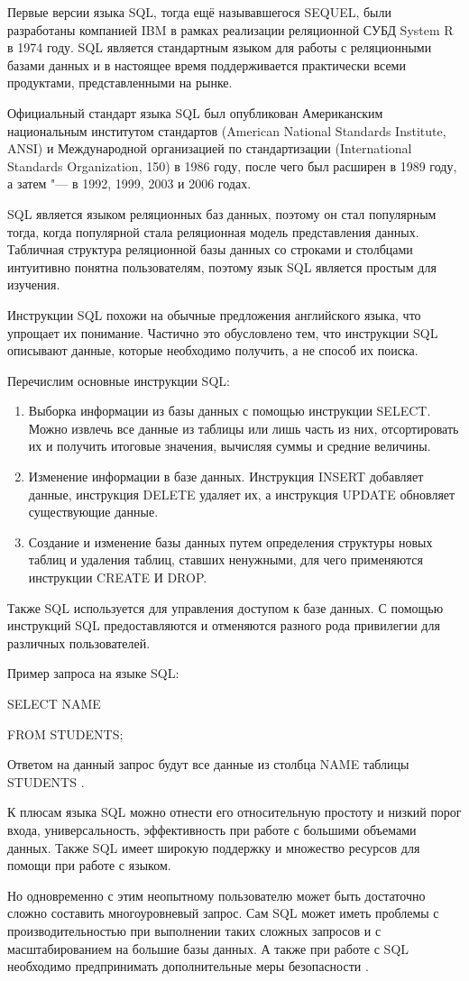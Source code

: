 Первые версии языка SQL, тогда ещё называвшегося SEQUEL, были разработаны компанией IBM в рамках реализации реляционной СУБД
System R в 1974 году. SQL является стандартным языком для работы с реляционными базами данных и в настоящее время 
поддерживается практически всеми продуктами, представленными на рынке.

Официальный стандарт языка SQL был опубликован Американским национальным институтом стандартов (American National Standards Institute, ANSI) и Международной организацией по стандартизации (International Standards Organization, 150) в 1986 году, после чего был расширен в 1989 году, а затем "--- в 1992, 1999, 2003 и 2006 годах.

SQL является языком реляционных баз данных, поэтому он стал популярным тогда, когда популярной стала реляционная модель представления данных. Табличная структура реляционной базы данных со строками и столбцами интуитивно понятна пользователям, поэтому язык SQL является простым для изучения. 

Инструкции SQL похожи на обычные предложения английского языка, что упрощает их понимание. Частично это обусловлено тем, что инструкции SQL описывают данные, которые необходимо получить, а не способ их поиска.

Перечислим основные инструкции SQL:

\begin{enumerate}
    \item Выборка информации из базы данных с помощью инструкции SELECT. Можно извлечь все данные из таблицы или лишь часть из них, отсортировать их и получить итоговые значения, вычисляя суммы и средние величины.
    \item Изменение информации в базе данных. Инструкция INSERT добавляет данные, инструкция DELETE удаляет их, а инструкция UPDATE обновляет существующие данные.
    \item Создание и изменение базы данных путем определения структуры новых таблиц и удаления таблиц, ставших ненужными, для чего применяются инструкции CREATE И DROP.
\end{enumerate}

Также SQL используется для управления доступом к базе данных. С помощью инструкций SQL предоставляются и отменяются разного рода привилегии для различных пользователей. 

Пример запроса на языке SQL: 

SELECT NAME

    FROM STUDENTS;

Ответом на данный запрос будут все данные из столбца NAME таблицы STUDENTS \cite{10}.

К плюсам языка SQL можно отнести его относительную простоту и низкий порог входа, универсальность, эффективность при работе с большими объемами данных. Также SQL имеет широкую поддержку и множество ресурсов для помощи при работе с языком.

Но одновременно с этим неопытному пользователю может быть достаточно сложно составить многоуровневый запрос. Сам SQL может иметь проблемы с производительностью при выполнении таких сложных запросов и с масштабированием на большие базы данных. А также при работе с SQL необходимо предпринимать дополнительные меры безопасности \cite{7}.